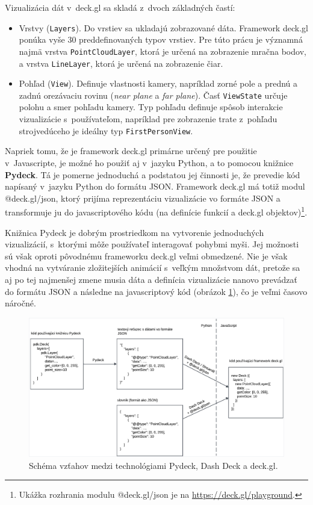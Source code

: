 Vizualizácia dát v~deck.gl sa skladá z~dvoch základných častí:
\begin{itemize}
    \item Vrstvy (\texttt{Layers}). Do vrstiev sa ukladajú zobrazované dáta. Framework deck.gl ponúka vyše 30 preddefinovaných typov vrstiev. Pre túto prácu je významná najmä vrstva \texttt{PointCloudLayer}, ktorá je určená na zobrazenie mračna bodov, a vrstva \texttt{LineLayer}, ktorá je určená na zobrazenie čiar.
    \item Pohľad (\texttt{View}). Definuje vlastnosti kamery, napríklad zorné pole a prednú a zadnú orezávaciu rovinu (\emph{near plane} a \emph{far plane}).
    Časť \texttt{ViewState} určuje polohu a smer pohľadu kamery. Typ pohľadu definuje spôsob interakcie vizualizácie s~používateľom, napríklad pre zobrazenie trate z~pohľadu strojvedúceho je ideálny typ \texttt{FirstPersonView}.
\end{itemize}

Napriek tomu, že je framework deck.gl primárne určený pre použitie v~Javascripte, je možné ho použiť aj v~jazyku Python, a to pomocou knižnice \textbf{Pydeck}. Tá je pomerne jednoduchá a podstatou jej činnosti je, že prevedie kód napísaný v~jazyku Python do formátu JSON. Framework deck.gl má totiž modul @deck.gl/json, ktorý prijíma reprezentáciu vizualizácie vo formáte JSON a transformuje ju do javascriptového kódu (na definície funkcií a deck.gl objektov)\footnote{Ukážka rozhrania modulu @deck.gl/json je na \url{https://deck.gl/playground}.}.

Knižnica Pydeck je dobrým prostriedkom na vytvorenie jednoduchých vizualizácií, s~ktorými môže používateľ interagovať pohybmi myši. Jej možnosti sú však oproti pôvodnému frameworku deck.gl veľmi obmedzené. Nie je však vhodná na vytváranie zložitejších animácií s~veľkým množstvom dát, pretože sa aj po tej najmenšej zmene musia dáta a definícia vizualizácie nanovo prevádzať do formátu JSON a následne na javascriptový kód (obrázok \ref{fig:pydeck_dashdeck_schema}), čo je veľmi časovo náročné.

\begin{figure}[h]
    \centering
    \includegraphics[width=1\linewidth]{text_prace/obrazky-figures/pydeck_dashdeck_transformacie.pdf}
    \caption{Schéma vzťahov medzi technológiami Pydeck, Dash Deck a deck.gl.}
    \label{fig:pydeck_dashdeck_schema}
\end{figure}

